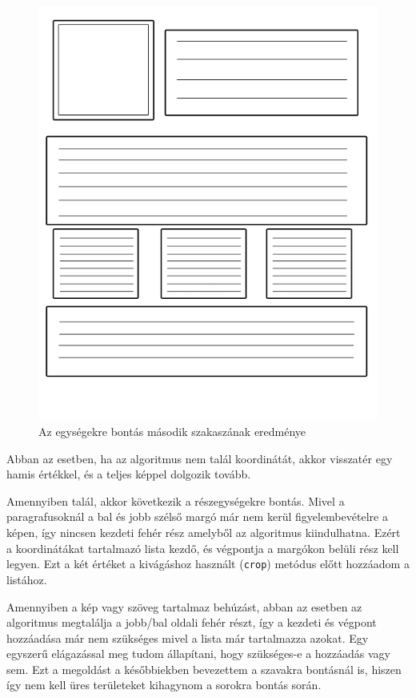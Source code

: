 \begin{figure}[h!]
\centering
\includegraphics[scale=0.8]{images/page3.png}
\caption{Az egységekre bontás második szakaszának eredménye}
\label{fig:page3}
\end{figure}

Abban az esetben, ha az algoritmus nem talál koordinátát, akkor visszatér egy hamis értékkel, és a teljes képpel dolgozik tovább.

Amennyiben talál, akkor következik a részegységekre bontás. Mivel a paragrafusoknál a bal és jobb szélső margó már nem kerül figyelembevételre a képen, így nincsen kezdeti fehér rész amelyből az algoritmus kiindulhatna. Ezért a koordinátákat tartalmazó lista kezdő, és végpontja a margókon belüli rész kell legyen. Ezt a két értéket a kivágáshoz használt (\texttt{crop}) metódus előtt hozzáadom a listához. 

Amennyiben a kép vagy szöveg tartalmaz behúzást, abban az esetben az algoritmus megtalálja a jobb/bal oldali fehér részt, így a kezdeti és végpont hozzáadása már nem szükséges mivel a lista már tartalmazza azokat. Egy egyszerű elágazással meg tudom állapítani, hogy szükséges-e a hozzáadás vagy sem. Ezt a megoldást a későbbiekben bevezettem a szavakra bontásnál is, hiszen így nem kell üres területeket kihagynom a sorokra bontás során.

